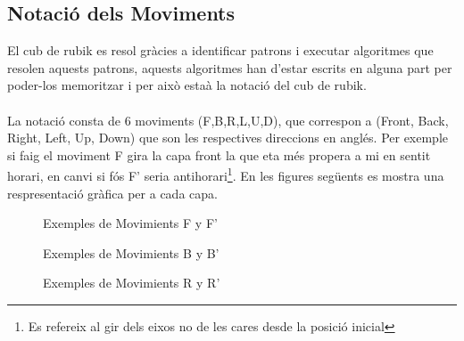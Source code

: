 \subsection{Notació dels Moviments}

El cub de rubik es resol gràcies a identificar patrons i executar algoritmes que resolen aquests patrons, aquests algoritmes han d'estar escrits en alguna part per poder-los memoritzar i per això estaà la notació del cub de rubik.
\\\\La notació consta de 6 moviments (F,B,R,L,U,D), que correspon a (Front, Back, Right, Left, Up, Down) que son les respectives direccions en anglés. Per exemple si faig el moviment F gira la capa front la que eta més propera a mi en sentit horari, en canvi si fós F' seria antihorari\footnote{Es refereix al gir dels eixos no de les cares desde la posició inicial}. En les figures següents es mostra una respresentació gràfica per a cada capa.

\begin{figure}[htbp]
    \centering
    \begin{subfigure}
        \centering\RubikCubeSolvedWY
    \end{subfigure}
    \begin{subfigure}
        \centering\RubikCubeSolvedWY
    \end{subfigure}
    \caption{Exemples de Movimients F y F'}
\end{figure}

\begin{figure}[htbp]
    \centering
    \begin{subfigure}
        \centering\RubikCubeSolvedWY
    \end{subfigure}
    \begin{subfigure}
        \centering\RubikCubeSolvedWY
    \end{subfigure}
    \caption{Exemples de Movimients B y B'}
\end{figure}

\begin{figure}[htbp]
    \centering
    \begin{subfigure}
        \centering\RubikCubeSolvedWY
    \end{subfigure}
    \begin{subfigure}
        \centering\RubikCubeSolvedWY
    \end{subfigure}
    \caption{Exemples de Movimients R y R'}
\end{figure}

